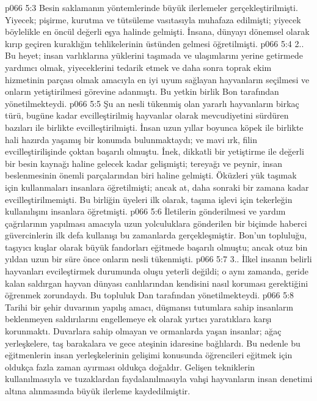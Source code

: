 \vs p066 5:3 Besin saklamanın yöntemlerinde büyük ilerlemeler gerçekleştirilmişti. Yiyecek; pişirme, kurutma ve tütsüleme vasıtasıyla muhafaza edilmişti; yiyecek böylelikle en öncül değerli eşya halinde gelmişti. İnsana, dünyayı dönemsel olarak kırıp geçiren kuraklığın tehlikelerinin üstünden gelmesi öğretilmişti.
\vs p066 5:4 2.\bibnobreakspace {}. Bu heyet; insan varlıklarına yüklerini taşımada ve ulaşımlarını yerine getirmede yardımcı olmak, yiyeceklerini tedarik etmek ve daha sonra toprak ekim hizmetinin parçası olmak amacıyla en iyi uyum sağlayan hayvanların seçilmesi ve onların yetiştirilmesi görevine adanmıştı. Bu yetkin birlik Bon tarafından yönetilmekteydi.
\vs p066 5:5 Şu an nesli tükenmiş olan yararlı hayvanların birkaç türü, bugüne kadar evcilleştirilmiş hayvanlar olarak mevcudiyetini sürdüren bazıları ile birlikte evcilleştirilmişti. İnsan uzun yıllar boyunca köpek ile birlikte hali hazırda yaşamış bir konumda bulunmaktaydı; ve mavi ırk, filin evcilleştirilişinde çoktan başarılı olmuştu. İnek, dikkatli bir yetiştirme ile değerli bir besin kaynağı haline gelecek kadar gelişmişti; tereyağı ve peynir, insan beslenmesinin önemli parçalarından biri haline gelmişti. Öküzleri yük taşımak için kullanmaları insanlara öğretilmişti; ancak at, daha sonraki bir zamana kadar evcilleştirilmemişti. Bu birliğin üyeleri ilk olarak, taşıma işlevi için tekerleğin kullanılışını insanlara öğretmişti.
\vs p066 5:6 İletilerin gönderilmesi ve yardım çağrılarının yapılması amacıyla uzun yolculuklara gönderilen bir biçimde haberci güvercinlerin ilk defa kullanışı bu zamanlarda gerçekleşmiştir. Bon’un topluluğu, taşıyıcı kuşlar olarak büyük fandorları eğitmede başarılı olmuştu; ancak otuz bin yıldan uzun bir süre önce onların nesli tükenmişti.
\vs p066 5:7 3.\bibnobreakspace {}. İlkel insanın belirli hayvanları evcileştirmek durumunda oluşu yeterli değildi; o aynı zamanda, geride kalan saldırgan hayvan dünyası canlılarından kendisini nasıl koruması gerektiğini öğrenmek zorundaydı. Bu topluluk Dan tarafından yönetilmekteydi.
\vs p066 5:8 Tarihi bir şehir duvarının yapılış amacı, düşmansı tutumlara sahip insanların beklenmeyen saldırılarını engellemeye ek olarak yırtıcı yaratıklara karşı korunmaktı. Duvarlara sahip olmayan ve ormanlarda yaşan insanlar; ağaç yerleşkelere, taş barakalara ve gece ateşinin idaresine bağlılardı. Bu nedenle bu eğitmenlerin insan yerleşkelerinin gelişimi konusunda öğrencileri eğitmek için oldukça fazla zaman ayırması oldukça doğaldır. Gelişen tekniklerin kullanılmasıyla ve tuzaklardan faydalanılmasıyla vahşi hayvanların insan denetimi altına alınmasında büyük ilerleme kaydedilmiştir.

